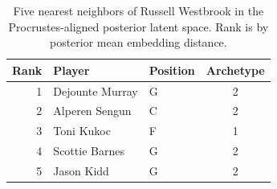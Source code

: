 \begin{table}[htbp]
  \centering\small
  \begin{tabular}{rllc}
    \toprule
    Rank & Player & Position & Archetype \\
    \midrule
    1 & Dejounte Murray & G & 2 \\
    2 & Alperen Sengun & C & 2 \\
    3 & Toni Kukoc & F & 1 \\
    4 & Scottie Barnes & G & 2 \\
    5 & Jason Kidd & G & 2 \\
    \bottomrule
  \end{tabular}
  \caption{Five nearest neighbors of Russell Westbrook in the Procrustes-aligned posterior latent space. Rank is by posterior mean embedding distance.}
  \label{tab:Russell_Westbrook_neighbors}
\end{table}

